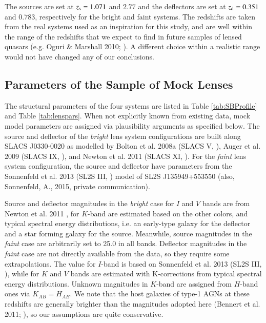 \documentclass[a4paper,11pt]{article}
\begin{document}
{The sources are set at $z_{\rm s} = 1.071$ and $2.77$ and the
deflectors are set at $z_{\rm d} = 0.351$ and $0.783$, respectively
for the bright and faint systems. The redshifts are taken from the
real systems used as an inspiration for this study, and are well
within the range of the redshifts that we expect to find in future
samples of lensed quasars (e.g. Oguri \& Marshall 2010;
\cite{2010MNRAS.405.2579O}). A different choice within a realistic
range would not have changed any of our conclusions.


\subsection{Parameters of the Sample of Mock Lenses}

The structural parameters of the four systems are listed in Table
\ref{tab:SBProfile} and Table \ref{tab:lenspars}. When not explicitly known from existing data,
mock model parameters are assigned via plausibility arguments as
specified below. The source and deflector of the \textit{bright} lens
system configurations are built along SLACS J0330-0020 as modelled by
Bolton et al. 2008a (SLACS V, \cite{2008ApJ...682..964B}), Auger et
al. 2009 (SLACS IX, \cite{2009ApJ...705.1099A}), and Newton et
al. 2011 (SLACS XI, \cite{2011ApJ...734..104N}). For the
\textit{faint} lens system configuration, the source and deflector
have parameters from the Sonnenfeld et al. 2013 (SL2S III,
\cite{2013ApJ...777...97S}) model of SL2S J135949+553550
(also, Sonnenfeld, A., 2015, private communication).

Source and deflector magnitudes in the \textit{bright} case for $I$ and
$V$ bands are from Newton et al. 2011 \cite{2011ApJ...734..104N}, for
$K$-band are estimated based on the other colors, and typical spectral
energy distributions, i.e. an early-type galaxy for the deflector and
a star forming galaxy for the source. Meanwhile, source magnitudes in
the \textit{faint} case are arbitrarily set to 25.0 in all
bands. Deflector magnitudes in the \textit{faint} case are not
directly available from the data, so they require some
extrapolations. The value for $I$-band is based on Sonnenfeld et
al. 2013 (SL2S III,
\cite{2013ApJ...777...97S}), while for $K$ and $V$ bands are estimated
with K-corrections from typical spectral energy distributions. Unknown
magnitudes in $K$-band are assigned from $H$-band ones via
$K_{AB}=H_{AB}$. We note that the host galaxies of type-1 AGNs at
these redshifts are generally brighter than the magnitudes adopted
here (Bennert et al. 2011; \cite{2011ApJ...742..107B}), so our
assumptions are quite conservative.

}
\end{document}
